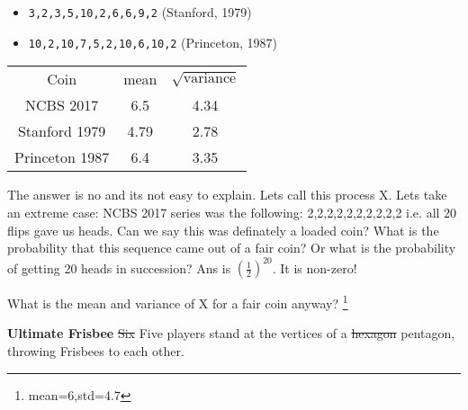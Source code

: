 \documentclass[a4paper,8pt,addpoints,solution]{exam}
\begin{document}
\begin{questions}
\begin{itemize}
    \item \verb|3,2,3,5,10,2,6,6,9,2|     (Stanford, 1979)
    \item \verb|10,2,10,7,5,2,10,6,10,2|  (Princeton, 1987)
\end{itemize}


\begin{solution}
\begin{tabular}{c c  c}
 Coin         & mean & $\sqrt{\text{variance}}$ \\
NCBS 2017     & 6.5  & 4.34  \\
Stanford 1979 & 4.79 & 2.78  \\
Princeton 1987& 6.4  & 3.35  \\
\end{tabular}

The answer is no and its not easy to explain.
Lets call this process X. Lets take an extreme case: NCBS 2017 series was the
following: 2,2,2,2,2,2,2,2,2,2 i.e. all 20 flips gave us heads. Can we say this
was definately a loaded coin? What is the probability that this sequence came
out of a fair coin? Or what is the probability of getting 20 heads in
succession? Ans is $(\frac{1}{2})^{20}$. It is non-zero!

What is the mean and variance of X for a fair coin anyway?  \footnote{mean=6,std=4.7}
\end{solution} 

\question[10] \textbf{Ultimate Frisbee} 
\sout{Six} Five players stand at the vertices of a \sout{hexagon} pentagon, throwing
Frisbees to each other.

\end{questions}
\end{document}
